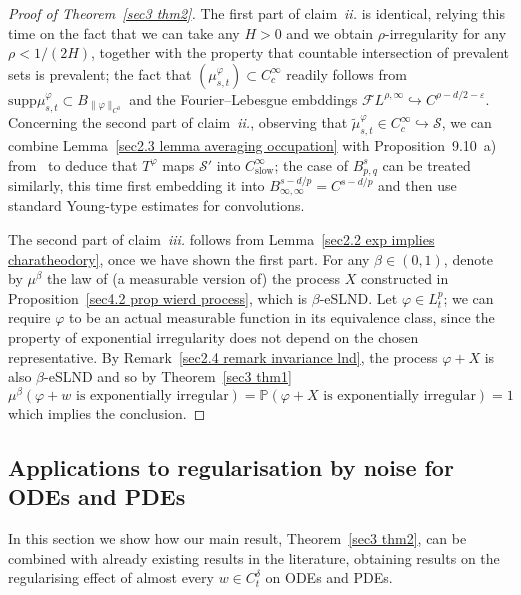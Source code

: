 \documentclass[10pt]{article}
\newcommand{\tmop}[1]{\ensuremath{\operatorname{#1}}}
\newcommand{\tmtextit}[1]{{\itshape{#1}}}
\begin{document}
\begin{proof}[Proof of Theorem~\ref{sec3 thm2}]
  The first part of claim~\tmtextit{ii.} is identical, relying this time on
  the fact that we can take any $H > 0$ and we obtain
  $\rho$\mbox{-}irregularity for any $\rho < 1 / (2 H)$, together with the
  property that countable intersection of prevalent sets is prevalent; the
  fact that $(\mu^{\varphi}_{s, t}) \subset C^{\infty}_c$ readily follows from
  $\text{supp} \mu^{\varphi}_{s, t} \subset B_{\| \varphi \|_{C^0}}$ and the
  Fourier--Lebesgue embddings $\mathcal{F} L^{\rho, \infty} \hookrightarrow
  C^{\rho - d / 2 - \varepsilon} $. Concerning the second part of
  claim~\tmtextit{ii.}, observing that $\tilde{\mu}^{\varphi}_{s, t} \in
  C^{\infty}_c \hookrightarrow \mathcal{S}$, we can combine Lemma~\ref{sec2.3
  lemma averaging occupation} with Proposition~9.10~a) from~{\cite{folland}}
  to deduce that $T^{\varphi}$ maps $\mathcal{S}'$ into
  $C^{\infty}_{\tmop{slow}}$; the case of $B^s_{p, q}$ can be treated
  similarly, this time first embedding it into $B^{s - d / p}_{\infty, \infty}
  = C^{s - d / p}$ and then use standard Young-type estimates for
  convolutions.
  
  The second part of claim~\tmtextit{iii.} follows from Lemma~\ref{sec2.2 exp
  implies charatheodory}, once we have shown the first part. For any $\beta
  \in (0, 1)$, denote by $\mu^{\beta}$ the law of (a measurable version of)
  the process $X$ constructed in Proposition~\ref{sec4.2 prop wierd process},
  which is $\beta$\mbox{-}eSLND. Let $\varphi \in L^p_t$; we can require
  $\varphi$ to be an actual measurable function in its equivalence class,
  since the property of exponential irregularity does not depend on the chosen
  representative. By Remark~\ref{sec2.4 remark invariance lnd}, the process
  $\varphi + X$ is also $\beta$\mbox{-}eSLND and so by Theorem~\ref{sec3 thm1}
  \[ \mu^{\beta} \left( \varphi + w \text{ is exponentially irregular} \right)
     =\mathbb{P} \left( \varphi + X \text{ is exponentially irregular} \right)
     = 1 \]
  which implies the conclusion.
\end{proof}

\subsection{Applications to regularisation by noise for ODEs and
PDEs}\label{sec3.2}

In this section we show how our main result, Theorem~\ref{sec3 thm2}, can be
combined with already existing results in the literature, obtaining results on
the regularising effect of almost every $w \in C^{\delta}_t$ on ODEs and PDEs.
\end{document}
